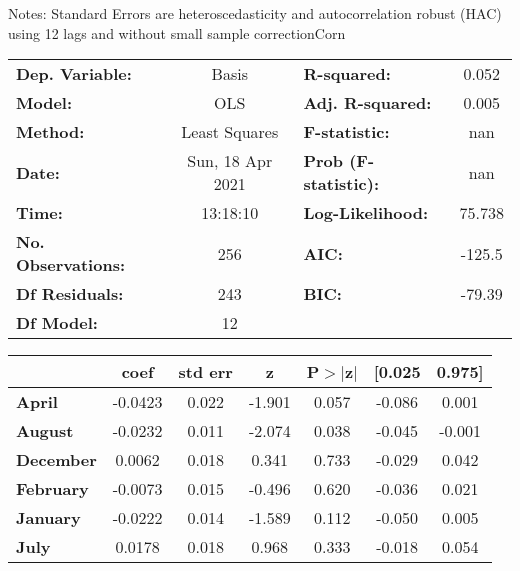 Notes: \newline
 [1] Standard Errors are heteroscedasticity and autocorrelation robust (HAC) using 12 lags and without small sample correctionCorn\begin{center}
\begin{tabular}{lclc}
\toprule
\textbf{Dep. Variable:}    &      Basis       & \textbf{  R-squared:         } &     0.052   \\
\textbf{Model:}            &       OLS        & \textbf{  Adj. R-squared:    } &     0.005   \\
\textbf{Method:}           &  Least Squares   & \textbf{  F-statistic:       } &       nan   \\
\textbf{Date:}             & Sun, 18 Apr 2021 & \textbf{  Prob (F-statistic):} &      nan    \\
\textbf{Time:}             &     13:18:10     & \textbf{  Log-Likelihood:    } &    75.738   \\
\textbf{No. Observations:} &         256      & \textbf{  AIC:               } &    -125.5   \\
\textbf{Df Residuals:}     &         243      & \textbf{  BIC:               } &    -79.39   \\
\textbf{Df Model:}         &          12      & \textbf{                     } &             \\
\bottomrule
\end{tabular}
\begin{tabular}{lcccccc}
                   & \textbf{coef} & \textbf{std err} & \textbf{z} & \textbf{P$> |$z$|$} & \textbf{[0.025} & \textbf{0.975]}  \\
\midrule
\textbf{April}     &      -0.0423  &        0.022     &    -1.901  &         0.057        &       -0.086    &        0.001     \\
\textbf{August}    &      -0.0232  &        0.011     &    -2.074  &         0.038        &       -0.045    &       -0.001     \\
\textbf{December}  &       0.0062  &        0.018     &     0.341  &         0.733        &       -0.029    &        0.042     \\
\textbf{February}  &      -0.0073  &        0.015     &    -0.496  &         0.620        &       -0.036    &        0.021     \\
\textbf{January}   &      -0.0222  &        0.014     &    -1.589  &         0.112        &       -0.050    &        0.005     \\
\textbf{July}      &       0.0178  &        0.018     &     0.968  &         0.333        &       -0.018    &        0.054     \\

\end{tabular}
\end{center}
